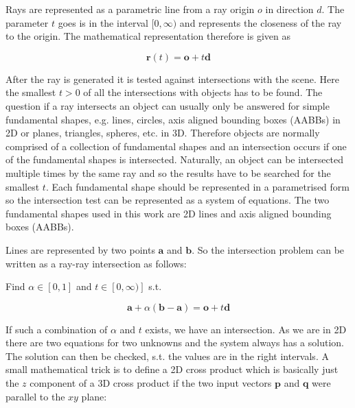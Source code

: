 \documentclass[a4paper,10pt]{article}
\renewcommand{\vec}[1]{\mathbf{#1}}
\begin{document}
    Rays are represented as a parametric line from a ray origin $o$ in
    direction $d$.
    The parameter $t$ goes is in the interval $[0, \infty)$ and represents
    the closeness of the ray to the origin.
    The mathematical representation therefore is given as

    \begin{equation}
        \label{equ:ray}
        \vec{r}(t) = \vec{o} + t\vec{d}
    \end{equation}

    After the ray is generated it is tested against intersections with the
    scene.
    Here the smallest $t > 0$ of all the intersections with objects has to
    be found.
    The question if a ray intersects an object can usually only be answered
    for simple fundamental shapes, e.g. lines, circles, axis aligned bounding
    boxes (AABBs) in 2D or planes, triangles, spheres, etc. in 3D.
    Therefore objects are normally comprised of a collection of fundamental
    shapes and an intersection occurs if one of the fundamental shapes is
    intersected.
    Naturally, an object can be intersected multiple times by the same ray
    and so the results have to be searched for the smallest $t$.
    Each fundamental shape should be represented in a parametrised form 
    so the intersection test can be represented as a system of equations.
    The two fundamental shapes used in this work are 2D lines and axis
    aligned bounding boxes (AABBs).

    Lines are represented by two points $\vec{a}$ and $\vec{b}$.
    So the intersection problem can be written as a ray-ray intersection
    as follows:

    Find $\alpha \in [0,1]$ and $t \in [0, \infty)]$ s.t. 

    \begin{equation}
        \label{equ:line_intersect}
        \vec{a} + \alpha (\vec{b} - \vec{a}) = \vec{o} + t \vec{d}
    \end{equation}

    If such a combination of $\alpha$ and $t$ exists, we have an intersection.
    As we are in 2D there are two equations for two unknowns and the
    system always has a solution.
    The solution can then be checked, s.t. the values are in the right
    intervals.
    A small mathematical trick is to define a 2D cross product which
    is basically just the $z$ component of a 3D cross product if the
    two input vectors $\vec{p}$ and $\vec{q}$ were parallel to the
    $xy$ plane:
    
\end{document}
